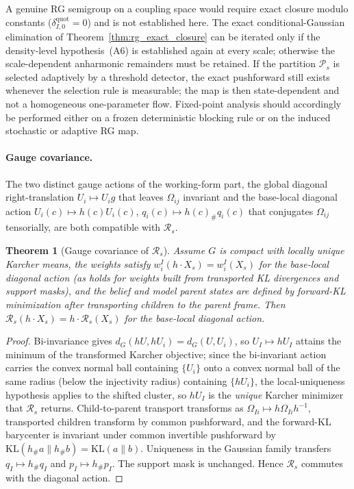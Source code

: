 \documentclass[11pt]{article}
\newtheorem{theorem}{Theorem}
\begin{document}
A genuine RG semigroup on a coupling space would require exact closure modulo constants ($\delta_{I,0}^{\mathrm{quot}}=0$) and is not established here. The exact conditional-Gaussian elimination of Theorem~\ref{thm:rg_exact_closure} can be iterated only if the density-level hypothesis~(A6) is established again at every scale; otherwise the scale-dependent anharmonic remainders must be retained. If the partition $\mathcal{P}_s$ is selected adaptively by a threshold detector, the exact pushforward still exists whenever the selection rule is measurable; the map is then state-dependent and not a homogeneous one-parameter flow. Fixed-point analysis should accordingly be performed either on a frozen deterministic blocking rule or on the induced stochastic or adaptive RG map.

\paragraph{Gauge covariance.}
The two distinct gauge actions of the working-form part, the global diagonal right-translation $U_i \mapsto U_i g$ that leaves $\Omega_{ij}$ invariant and the base-local diagonal action $U_i(c) \mapsto h(c) U_i(c)$, $q_i(c) \mapsto h(c)_\# q_i(c)$ that conjugates $\Omega_{ij}$ tensorially, are both compatible with $\mathcal{R}_s$.

\begin{theorem}[Gauge covariance of $\mathcal{R}_s$]
\label{thm:rg_covariance}
Assume $G$ is compact with locally unique Karcher means, the weights satisfy $w_i^I(h \cdot X_s) = w_i^I(X_s)$ for the base-local diagonal action (as holds for weights built from transported KL divergences and support masks), and the belief and model parent states are defined by forward-KL minimization after transporting children to the parent frame. Then $\mathcal{R}_s(h \cdot X_s) = h \cdot \mathcal{R}_s(X_s)$ for the base-local diagonal action.
\end{theorem}

\begin{proof}
Bi-invariance gives $d_G(hU, hU_i) = d_G(U, U_i)$, so $U_I \mapsto hU_I$ attains the minimum of the transformed Karcher objective; since the bi-invariant action carries the convex normal ball containing $\{U_i\}$ onto a convex normal ball of the same radius (below the injectivity radius) containing $\{hU_i\}$, the local-uniqueness hypothesis applies to the shifted cluster, so $hU_I$ is the \emph{unique} Karcher minimizer that $\mathcal{R}_s$ returns. Child-to-parent transport transforms as $\Omega_{Ii} \mapsto h\Omega_{Ii}h^{-1}$, transported children transform by common pushforward, and the forward-KL barycenter is invariant under common invertible pushforward by $\mathrm{KL}(h_\# a \| h_\# b) = \mathrm{KL}(a \| b)$. Uniqueness in the Gaussian family transfers $q_I \mapsto h_\# q_I$ and $p_I \mapsto h_\# p_I$. The support mask is unchanged. Hence $\mathcal{R}_s$ commutes with the diagonal action.
\end{proof}
\end{document}
